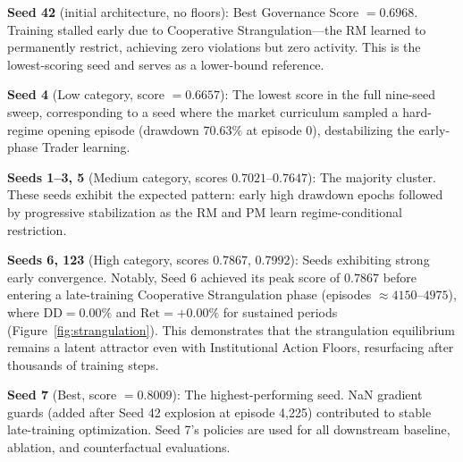 \documentclass[11pt]{article}
\begin{document}
\textbf{Seed 42} (initial architecture, no floors): Best Governance Score $= 0.6968$. Training stalled early due to Cooperative Strangulation---the RM learned to permanently restrict, achieving zero violations but zero activity. This is the lowest-scoring seed and serves as a lower-bound reference.

\textbf{Seed 4} (Low category, score $= 0.6657$): The lowest score in the full nine-seed sweep, corresponding to a seed where the market curriculum sampled a hard-regime opening episode (drawdown $70.63\%$ at episode 0), destabilizing the early-phase Trader learning.

\textbf{Seeds 1--3, 5} (Medium category, scores $0.7021$--$0.7647$): The majority cluster. These seeds exhibit the expected pattern: early high drawdown epochs followed by progressive stabilization as the RM and PM learn regime-conditional restriction.

\textbf{Seeds 6, 123} (High category, scores $0.7867$, $0.7992$): Seeds exhibiting strong early convergence. Notably, Seed 6 achieved its peak score of $0.7867$ before entering a late-training Cooperative Strangulation phase (episodes $\approx 4150$--$4975$), where $\text{DD} = 0.00\%$ and $\text{Ret} = +0.00\%$ for sustained periods (Figure~\ref{fig:strangulation}). This demonstrates that the strangulation equilibrium remains a latent attractor even with Institutional Action Floors, resurfacing after thousands of training steps.

\textbf{Seed 7} (Best, score $= \mathbf{0.8009}$): The highest-performing seed. NaN gradient guards (added after Seed 42 explosion at episode 4{,}225) contributed to stable late-training optimization. Seed 7's policies are used for all downstream baseline, ablation, and counterfactual evaluations.
\end{document}
